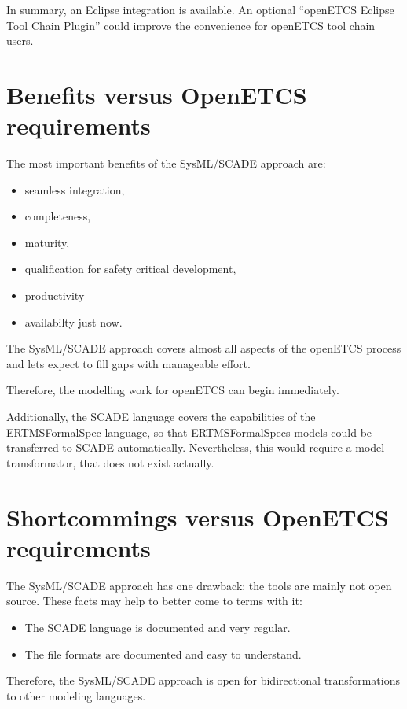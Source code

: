 In summary, an Eclipse integration is available. An optional "`openETCS Eclipse Tool Chain Plugin"' could improve the convenience for openETCS tool chain users. 


\section{Benefits versus OpenETCS requirements}

The most important benefits of the SysML/SCADE approach are: 

\begin{itemize}
	\item seamless integration,
	\item completeness,
	\item maturity,
	\item qualification for safety critical development,
	\item productivity
	\item availabilty just now.
\end{itemize}
 
The SysML/SCADE approach covers almost all aspects of the openETCS process and lets expect to fill gaps with manageable effort.

Therefore, the modelling work for openETCS can begin immediately. 

Additionally, the SCADE language covers the capabilities of the ERTMSFormalSpec language, so that ERTMSFormalSpecs models could be transferred to SCADE automatically. Nevertheless, this would require a model transformator, that does not exist actually.   


\section{Shortcommings versus OpenETCS requirements}

The SysML/SCADE approach has one drawback: the tools are mainly not open source. 
These facts may help to better come to terms with it:

\begin{itemize}
	\item The SCADE language is documented and very regular. 
	\item The file formats are documented and easy to understand. 
\end{itemize}

Therefore, the SysML/SCADE approach is open for bidirectional transformations to other modeling languages. 


